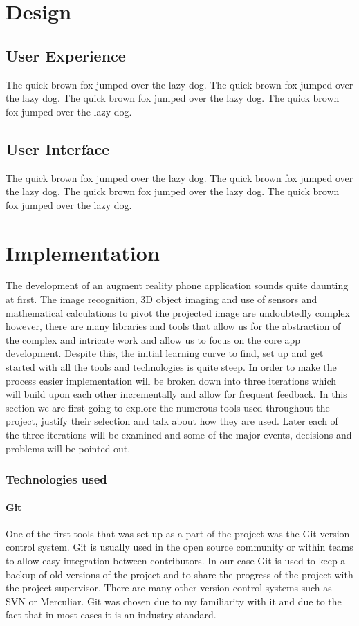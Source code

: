 \documentclass{l4proj}
\begin{document}
\chapter{Design}
\section{User Experience}
The quick brown fox jumped over the lazy dog.
The quick brown fox jumped over the lazy dog.
The quick brown fox jumped over the lazy dog.
The quick brown fox jumped over the lazy dog.
\section{User Interface}
The quick brown fox jumped over the lazy dog.
The quick brown fox jumped over the lazy dog.
The quick brown fox jumped over the lazy dog.
The quick brown fox jumped over the lazy dog.

\chapter{Implementation}
The development of an augment reality phone application sounds quite daunting at first. The image recognition, 3D object imaging and use of sensors and mathematical calculations to pivot the projected image are undoubtedly complex however, there are many libraries and tools that allow us for the abstraction of the complex and intricate work and allow us to focus on the core app development. Despite this, the initial learning curve to find, set up and get started with all the tools and technologies is quite steep. In order to make the process easier implementation will be broken down into three iterations which will build upon each other incrementally and allow for frequent feedback. In this section we are first going to explore the numerous tools used throughout the project, justify their selection and talk about how they are used. Later each of the three iterations will be examined and some of the major events, decisions and problems will be pointed out.

\subsection{Technologies used}
\subsubsection{Git}
One of the first tools that was set up as a part of the project was the Git version control system. Git is usually used in the open source community or within teams to allow easy integration between contributors. In our case Git is used to keep a backup of old versions of the project and to share the progress of the project with the project supervisor. There are many other version control systems such as SVN or Merculiar. Git was chosen due to my familiarity with it and due to the fact that in most cases it is an industry standard.
	
\end{document}
